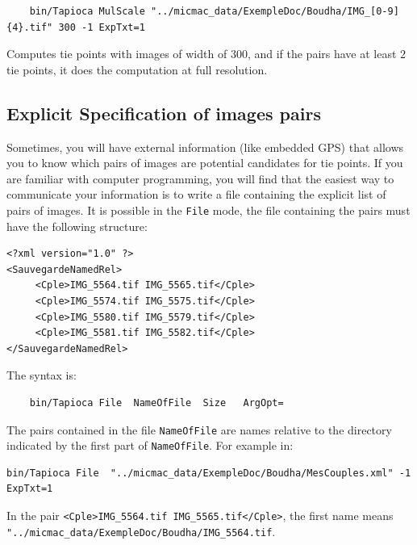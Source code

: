 {\scriptsize
\begin{verbatim}
    bin/Tapioca MulScale "../micmac_data/ExempleDoc/Boudha/IMG_[0-9]{4}.tif" 300 -1 ExpTxt=1
\end{verbatim}
}

Computes  tie points with images of width of $300$, and if the pairs have at least
$2$ tie points, it does the computation at full resolution.



\subsection{Explicit Specification of images pairs} %

Sometimes, you will have external information (like embedded GPS) that allows
you to know which pairs of images are potential candidates for tie points.
If you are familiar with computer programming, you will find that
the easiest way to communicate your information is to write a file
containing the explicit list of pairs of images.
It is possible in the {\tt File} mode, the file containing
the pairs must have the following structure:

{\scriptsize
\begin{verbatim}
<?xml version="1.0" ?>
<SauvegardeNamedRel>
     <Cple>IMG_5564.tif IMG_5565.tif</Cple>
     <Cple>IMG_5574.tif IMG_5575.tif</Cple>
     <Cple>IMG_5580.tif IMG_5579.tif</Cple>
     <Cple>IMG_5581.tif IMG_5582.tif</Cple>
</SauvegardeNamedRel>
\end{verbatim}
}

The syntax is:


{\scriptsize
\begin{verbatim}
    bin/Tapioca File  NameOfFile  Size   ArgOpt=
\end{verbatim}
}

The pairs contained in the file {\tt NameOfFile} are names relative
to the directory indicated by the first part of {\tt NameOfFile}.
For example in:

{\scriptsize
\begin{verbatim}
bin/Tapioca File  "../micmac_data/ExempleDoc/Boudha/MesCouples.xml" -1  ExpTxt=1
\end{verbatim}
}


In the pair {\tt <Cple>IMG\_5564.tif IMG\_5565.tif</Cple>}, the first name means
\newline
{\tt "../micmac\_data/ExempleDoc/Boudha/IMG\_5564.tif}.




